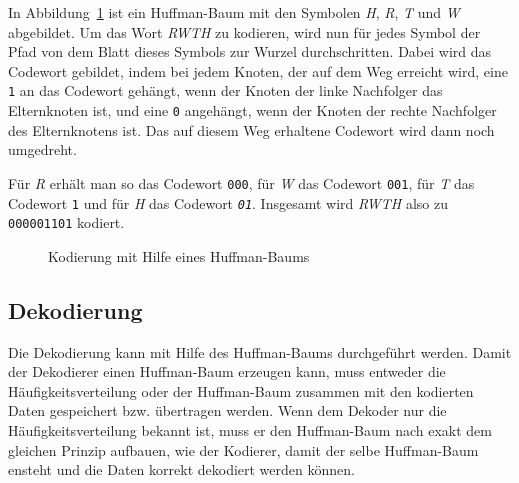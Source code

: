 \documentclass[twoside,11pt,a4paper]{article}
\theoremstyle{break}
\begin{document}
In Abbildung~\ref{fig:HKOD} ist ein Huffman-Baum mit den Symbolen
\emph{H}, \emph{R}, \emph{T} und \emph{W} abgebildet. Um das Wort
\emph{RWTH} zu kodieren, wird nun für jedes Symbol der Pfad von dem
Blatt dieses Symbols zur Wurzel durchschritten. Dabei wird das
Codewort gebildet, indem bei jedem Knoten, der auf dem Weg erreicht
wird, eine {\tt1} an das Codewort gehängt, wenn der Knoten der linke
Nachfolger das Elternknoten ist, und eine {\tt0} angehängt, wenn der
Knoten der rechte Nachfolger des Elternknotens ist. Das auf diesem
Weg erhaltene Codewort wird dann noch umgedreht.

Für \emph{R} erhält man so das Codewort {\tt000}, für \emph{W} das
Codewort {\tt001}, für \emph{T} das Codewort {\tt1} und für \emph{H}
das Codewort \emph{\tt01}. Insgesamt wird \emph{RWTH} also zu
{\tt000001101} kodiert.

\begin{figure}[h]
\centering
{}
\caption{Kodierung mit Hilfe eines Huffman-Baums} \label{fig:HKOD}
\end{figure}

\subsection{Dekodierung} \label{sec:huffman-dec}
Die Dekodierung kann mit Hilfe des Huffman-Baums durchgeführt
werden. Damit der Dekodierer einen Huffman-Baum erzeugen kann, muss
entweder die Häufigkeitsverteilung oder der Huffman-Baum zusammen mit
den kodierten Daten gespeichert bzw. übertragen werden. Wenn dem
Dekoder nur die Häufigkeitsverteilung bekannt ist, muss er den
Huffman-Baum nach exakt dem gleichen Prinzip aufbauen, wie der
Kodierer, damit der selbe Huffman-Baum ensteht und die Daten korrekt
dekodiert werden können.
\end{document}
